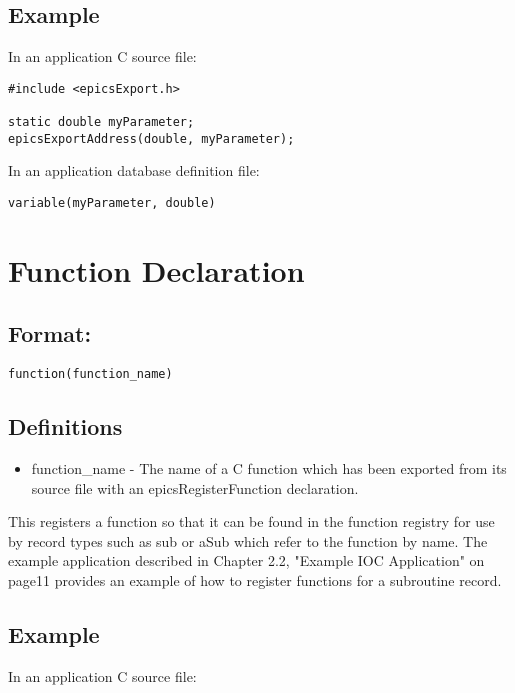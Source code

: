 \subsection{Example}

In an application C source file:

\begin{verbatim}#include <epicsExport.h>

static double myParameter;
epicsExportAddress(double, myParameter);
\end{verbatim}In an application database definition file:

\begin{verbatim}variable(myParameter, double)
\end{verbatim}\section{Function Declaration}

\subsection{Format:}

\begin{verbatim}function(function_name)
\end{verbatim}\subsection{Definitions}

\begin{itemize}\item {}function\_name - The name of a C function which has been exported from its source file with an 
epicsRegisterFunction declaration.

\end{itemize}This registers a function so that it can be found in the function registry for use by record types such as sub or aSub which 
refer to the function by name. The example application described in Chapter 2.2, "Example IOC Application" on page11 
provides an example of how to register functions for a subroutine record.

\subsection{Example}

In an application C source file:

